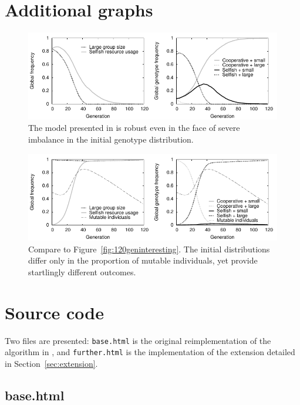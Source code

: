 \documentclass[11pt]{article}
\begin{document}
\begin{appendices}
\section{Additional graphs}
\label{app:graphs}
\vspace{-.5cm}
\begin{figure}[!ht]
  \centering
  \includegraphics{unevenplot.pdf}
  \caption{The model presented in \citet{orig} is robust even in the face of severe imbalance in the initial genotype distribution.}
  \label{fig:unevenplot}
\end{figure}
\vspace{-.5cm}
\begin{figure}[!ht]
  \centering
  \includegraphics{further1.pdf}
  \caption{Compare to Figure~\ref{fig:120geninteresting}. The initial distributions differ only in the proportion of mutable individuals, yet provide startlingly different outcomes.}
  \label{fig:further1}
\end{figure}


\newpage
\section{Source code}
Two files are presented: \texttt{base.html} is the original reimplementation of the algorithm in \citet{orig}, and \texttt{further.html} is the implementation of the extension detailed in Section~\ref{sec:extension}.
\lstset{language=HTML, basicstyle=\ttfamily\tiny, commentstyle=\ttfamily\tiny, tabsize=2, showstringspaces=false,}
\subsection*{base.html}
\vspace{-.35cm}

\newpage

\end{appendices}
\end{document}
